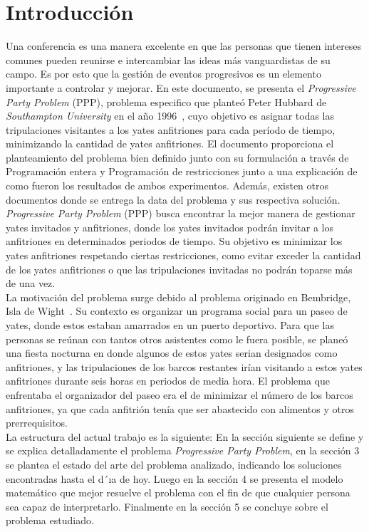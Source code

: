 \documentclass[letter, 10pt]{article}
\begin{document}
\section{Introducci\'on}
Una conferencia es una manera excelente en que las personas que tienen intereses comunes pueden reunirse e intercambiar las ideas m\'as vanguardistas de su campo. Es por esto que la gestión de eventos progresivos es un elemento importante a controlar y mejorar. En este documento, se presenta el \textit{Progressive Party Problem} (PPP), problema especifico que plante\'o Peter Hubbard de \textit{Southampton University} en el a\~no 1996~\cite{PPP_ILP_CPC}, cuyo objetivo es asignar todas las tripulaciones visitantes a los yates anfitriones para cada período de tiempo, minimizando la cantidad de yates anfitriones. El documento proporciona el planteamiento del problema bien definido junto con su formulación a través de Programación entera y Programación de restricciones junto a una explicación de como fueron los resultados de ambos experimentos. Además, existen otros documentos donde se entrega la data del problema y sus respectiva solución.
\\

\textit{Progressive Party Problem} (PPP) busca encontrar la mejor manera de gestionar yates invitados y anfitriones, donde los yates invitados podrán invitar a los anfitriones en determinados periodos de tiempo. Su objetivo es minimizar los yates anfitriones respetando ciertas restricciones, como evitar exceder la cantidad de los yates anfitriones o que las tripulaciones invitadas no podrán toparse más de una vez.
\\

La motivación del problema surge debido al problema originado en Bembridge, Isla de Wight~\cite{PPP_MIP}. Su contexto es organizar un programa social para un paseo de yates, donde estos estaban amarrados en un puerto deportivo. Para que las personas se reúnan con tantos otros asistentes como le fuera posible, se planeó una fiesta nocturna en donde algunos de estos yates serian designados como anfitriones, y las tripulaciones de los barcos restantes ir\'ian visitando a estos yates anfitriones durante seis horas en periodos de media hora. El problema que enfrentaba el organizador del paseo era el de minimizar el número de los barcos anfitriones, ya que cada anfitrión tenía que ser abastecido con alimentos y otros prerrequisitos. 
\\

La estructura del actual trabajo es la siguiente: En la sección siguiente se define y se explica detalladamente el problema \textit{Progressive Party Problem}, en la sección 3 se plantea el estado del arte del problema analizado, indicando los soluciones encontradas hasta el d´ıa de hoy. Luego en la sección 4 se presenta el modelo matemático que mejor resuelve el problema con el fin de que cualquier persona sea capaz de interpretarlo. Finalmente en la sección 5 se concluye sobre el problema estudiado.
\end{document}
